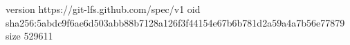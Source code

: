 version https://git-lfs.github.com/spec/v1
oid sha256:5abdc9f6ae6d503abb88b7128a126f3f44154e67b6b781d2a59a4a7b56e77879
size 529611
